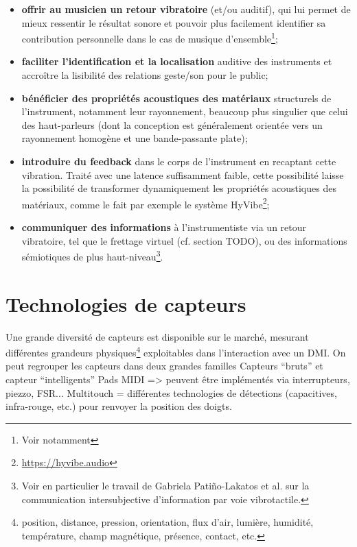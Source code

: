 \begin{itemize}[noitemsep]
	\item \textbf{offrir au musicien un retour vibratoire} (et/ou auditif), qui lui permet de mieux ressentir le résultat sonore et pouvoir plus facilement identifier sa contribution personnelle dans le cas de musique d'ensemble\footnote{Voir notamment };
	\item \textbf{faciliter l'identification et la localisation} auditive des instruments et accroître la lisibilité des relations geste/son pour le public;
	\item \textbf{bénéficier des propriétés acoustiques des matériaux} structurels de l'instrument, notamment leur rayonnement, beaucoup plus singulier que celui des haut-parleurs (dont la conception est généralement orientée vers un rayonnement homogène et une bande-passante plate);
	\item \textbf{introduire du feedback} dans le corps de l'instrument en recaptant cette vibration. Traité avec une latence suffisamment faible, cette possibilité laisse la possibilité de transformer dynamiquement les propriétés acoustiques des matériaux, comme le fait par exemple le système HyVibe\footnote{\url{https://hyvibe.audio}};
	\item \textbf{communiquer des informations} à l'instrumentiste via un retour vibratoire, tel que le frettage virtuel (cf. section TODO), ou des informations sémiotiques de plus haut-niveau\footnote{Voir en particulier le travail de Gabriela Patiño-Lakatos et al. \cite{patino-lakatos_paradigmes_2019} sur la communication intersubjective d'information par voie vibrotactile.}.
\end{itemize}



\section{Technologies de capteurs}

Une grande diversité de capteurs est disponible sur le marché, mesurant différentes grandeurs physiques\footnote{position, distance, pression, orientation, flux d'air, lumière, humidité, température, champ magnétique, présence, contact, etc.} exploitables dans l'interaction avec un \gls{DMI}. On peut regrouper les capteurs dans deux grandes familles
Capteurs ``bruts'' et capteur ``intelligents''
Pads MIDI => peuvent être implémentés via interrupteurs, piezzo, FSR...
Multitouch = différentes technologies de détections (capacitives, infra-rouge, etc.) pour renvoyer la position des doigts.


